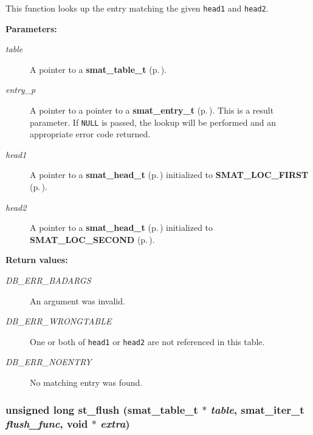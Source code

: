  This function looks up the entry matching the given {\tt head1} and {\tt head2}.\begin{Desc}
\item[{\bf Parameters: }]\par
\begin{description}
\item[
{\em table}]A pointer to a {\bf smat\_\-table\_\-t} {\rm (p.\,\pageref{group__dbprim__smat_a0})}. \item[
{\em entry\_\-p}]A pointer to a pointer to a {\bf smat\_\-entry\_\-t} {\rm (p.\,\pageref{group__dbprim__smat_a2})}. This is a result parameter. If {\tt NULL} is passed, the lookup will be performed and an appropriate error code returned. \item[
{\em head1}]A pointer to a {\bf smat\_\-head\_\-t} {\rm (p.\,\pageref{group__dbprim__smat_a1})} initialized to {\bf SMAT\_\-LOC\_\-FIRST} {\rm (p.\,\pageref{group__dbprim__smat_a48a102})}. \item[
{\em head2}]A pointer to a {\bf smat\_\-head\_\-t} {\rm (p.\,\pageref{group__dbprim__smat_a1})} initialized to {\bf SMAT\_\-LOC\_\-SECOND} {\rm (p.\,\pageref{group__dbprim__smat_a48a103})}.\end{description}
\end{Desc}
\begin{Desc}
\item[{\bf Return values: }]\par
\begin{description}
\item[
{\em DB\_\-ERR\_\-BADARGS}]An argument was invalid. \item[
{\em DB\_\-ERR\_\-WRONGTABLE}]One or both of {\tt head1} or {\tt head2} are not referenced in this table. \item[
{\em DB\_\-ERR\_\-NOENTRY}]No matching entry was found. \end{description}
\end{Desc}
\subsubsection{\setlength{\rightskip}{0pt plus 5cm}unsigned long st\_\-flush ({\bf smat\_\-table\_\-t} $\ast$ {\em table}, {\bf smat\_\-iter\_\-t} {\em flush\_\-func}, void $\ast$ {\em extra})}\label{group__dbprim__smat_a14}




